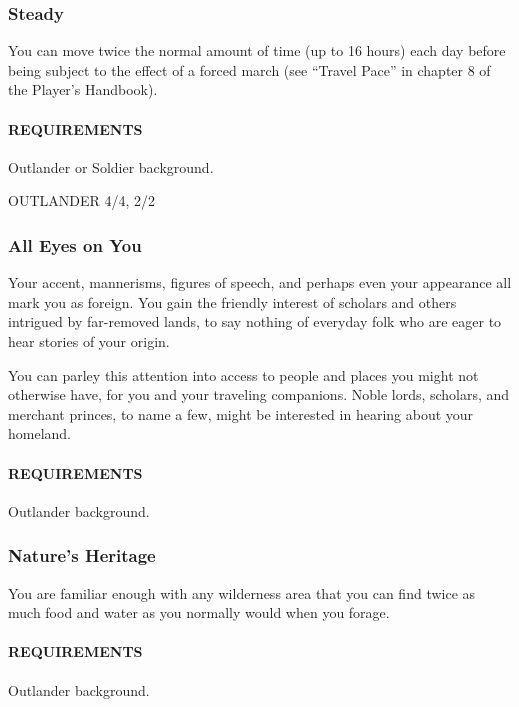     \subsubsection{Steady} \label{feat::steady}
        You can move twice the normal amount of time (up to 16 hours) each day before being subject to the effect of a forced march (see ``Travel Pace'' in chapter 8 of the Player's Handbook).
        \paragraph{REQUIREMENTS} Outlander or Soldier background.

OUTLANDER 4/4, 2/2
    \subsubsection{All Eyes on You} \label{feat::alleyesonyou}
        Your accent, mannerisms, figures of speech, and perhaps even your appearance all mark you as foreign.
        You gain the friendly interest of scholars and others intrigued by far-removed lands, to say nothing of everyday folk who are eager to hear stories of your origin.

        You can parley this attention into access to people and places you might not otherwise have, for you and your traveling companions.
        Noble lords, scholars, and merchant princes, to name a few, might be interested in hearing about your homeland.
        \paragraph{REQUIREMENTS} Outlander background.

    \subsubsection{Nature's Heritage} \label{feat::naturesheritage}
        You are familiar enough with any wilderness area that you can find twice as much food and water as you normally would when you forage.
        \paragraph{REQUIREMENTS} Outlander background.

